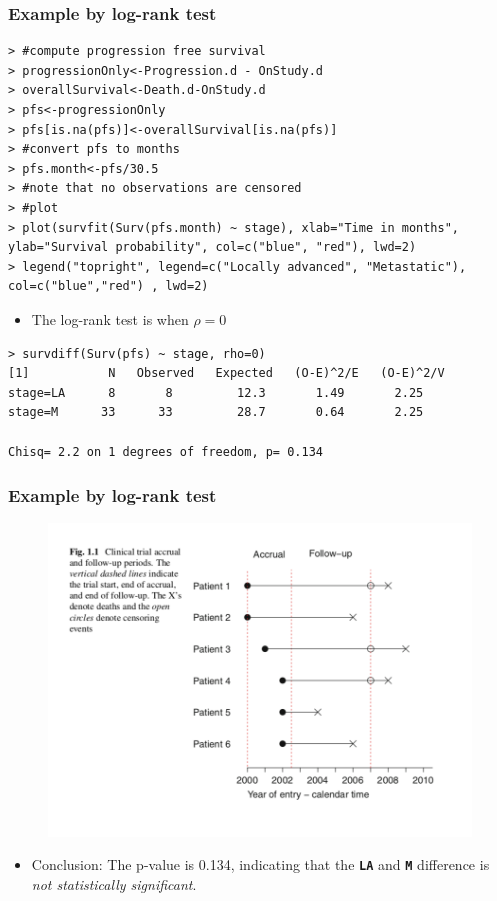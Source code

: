 \documentclass{beamer}
\newcommand{\empr}[1]{{\emph{\color{red}#1}}}
\newcommand{\pkg}[1]{{\textbf{\texttt{#1}}}}
\begin{document}
\pagebreak
\begin{frame}[fragile]
\frametitle{Example by log-rank test}
\begin{Verbatim}
> #compute progression free survival
> progressionOnly<-Progression.d - OnStudy.d
> overallSurvival<-Death.d-OnStudy.d
> pfs<-progressionOnly
> pfs[is.na(pfs)]<-overallSurvival[is.na(pfs)]
> #convert pfs to months
> pfs.month<-pfs/30.5
> #note that no observations are censored
> #plot
> plot(survfit(Surv(pfs.month) ~ stage), xlab="Time in months", 
ylab="Survival probability", col=c("blue", "red"), lwd=2) 
> legend("topright", legend=c("Locally advanced", "Metastatic"),
col=c("blue","red") , lwd=2)
\end{Verbatim}
\begin{itemize}
\item 	{\color{red}The log-rank test} is when {\color{red}$\rho=0$}
\end{itemize}
\begin{Verbatim}
> survdiff(Surv(pfs) ~ stage, rho=0)
[1]           N   Observed   Expected   (O-E)^2/E   (O-E)^2/V
stage=LA      8       8         12.3       1.49       2.25
stage=M      33      33         28.7       0.64       2.25

Chisq= 2.2 on 1 degrees of freedom, p= 0.134
\end{Verbatim}
\end{frame}
\pagebreak
\begin{frame}
\frametitle{Example by log-rank test}
\begin{figure}[h!]
\includegraphics[scale = .4]{003.png}
\end{figure}
\begin{itemize}
	\item Conclusion: The p-value is 0.134, indicating that the \pkg{LA} and \pkg{M} difference is \empr{not statistically significant}.
\end{itemize}
\end{frame}
\end{document}

